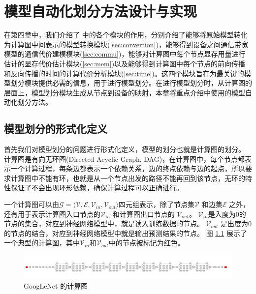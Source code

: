 \chapter{模型自动化划分方法设计与实现}
在第四章中，我们介绍了\sys{} 中的各个模块的作用，分别介绍了能够将原始模型转化为计算图中间表示的模型转换模块(\ref{sec:convertion})，能够得到设备之间通信带宽模型的通信代价建模模块(\ref{sec:commu})，能够对计算图中每个节点显存用量进行估计的显存代价估计模块(\ref{sec:mem})以及能够得到计算图中每个节点的前向传播和反向传播的时间的计算代价分析模块(\ref{sec:time})。这四个模块旨在为最关键的模型划分模块提供必需的信息，用于进行模型划分。在进行模型划分时，从计算图的层面上，模型划分模块生成从节点到设备的映射，本章将重点介绍\sys{}中使用的模型自动化划分方法。

\section{模型划分的形式化定义}
\label{sec:formul}
首先我们对模型划分的问题进行形式化定义，模型的划分也就是计算图的划分。
计算图是有向无环图(Directed Acyclic Graph, DAG)，在计算图中，每个节点都表示一个计算过程，每条边都表示一个依赖关系，边的终点依赖与边的起点，所以要求计算图中不能有环，也就是从一个节点出发的路径不能再回到该节点，无环的特性保证了不会出现环形依赖，确保计算过程可以正确进行。

一个计算图可以由$\mathcal{G}=\langle \mathcal{V}, \mathcal{E}, \mathcal{V}_{\mathit{in}}, \mathcal{V}_{\mathit{out}} \rangle $四元组表示，除了节点集$\mathcal{V}$ 和边集$\mathcal{E}$ 之外，还有用于表示计算图入口节点的$\mathcal{V}_\mathit{in}$ 和计算图出口节点的 $\mathcal{V}_{\mathit{out}}$。
$\mathcal{V}_{\mathit{in}}$是入度为0的节点的集合，对应到神经网络模型中，就是读入训练数据的节点。
$\mathcal{V}_{\mathit{out}}$ 是出度为0的节点的结合，对应到神经网络模型中就是输出预测结果的节点。
图 \ref{fig:graph-example} 展示了一个典型的计算图，其中$\mathcal{V}_\mathit{in}$和$\mathcal{V}_\mathit{out}$中的节点被标记为红色。

\begin{figure}[h]
	\centering
	\includegraphics[width=\textwidth]{figure/4-alg/googlenet.png}
	\caption{GoogLeNet 的计算图}
	\label{fig:graph-example}
\end{figure}

